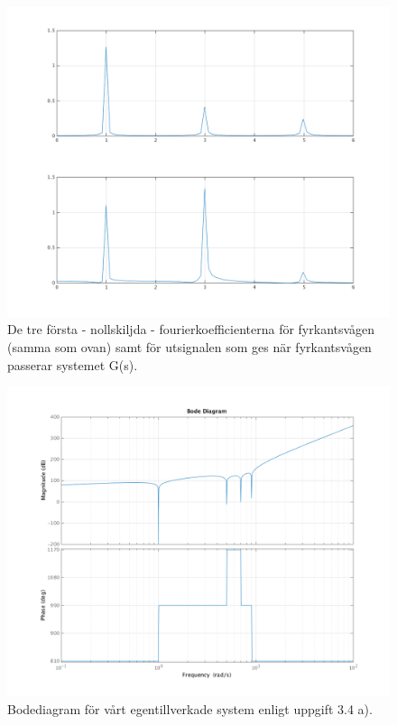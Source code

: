 \begin{figure}
    \label{fig:task3d+fk}
    \caption{De tre första - nollskiljda - fourierkoefficienterna för
    fyrkantsvågen (samma som ovan) samt för utsignalen som ges när
    fyrkantsvågen passerar systemet G(s).}
    \centering
    \includegraphics[scale=0.55]{figures/task3d+fk.png}
\end{figure}

\begin{figure}
    \label{fig:task4a-bode}
    \caption{Bodediagram för vårt egentillverkade system enligt uppgift 3.4 a).}
    \centering
    \includegraphics[scale=0.55]{figures/task4a-bode.png}
\end{figure}

